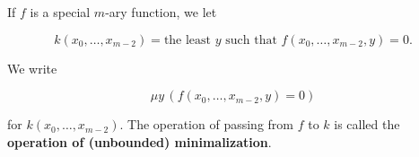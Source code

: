 If $f$ is a special $m$-ary function, we let

$$k(x_0, \ldots, x_{m-2}) = \text{the least } y \text{ such that } f(x_0, \ldots, x_{m-2}, y) = 0.$$

We write

$$\mu y\,(f(x_0, \ldots, x_{m-2}, y) = 0)$$

for $k(x_0, \ldots, x_{m-2})$. The operation of passing from $f$ to $k$ is called the \textbf{operation of (unbounded) minimalization}.
